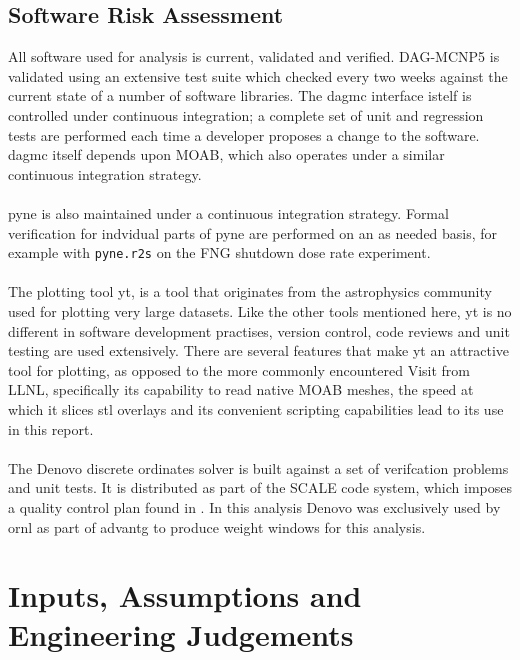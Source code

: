 \documentclass[12pt]{article}
\begin{document}
\subsection{Software Risk Assessment}
All software used for analysis is current, validated and verified. DAG-MCNP5
is validated using an extensive test suite which checked every two weeks against
the current state of a number of software libraries.  The \gls{dagmc} interface
istelf is controlled under continuous integration; a complete set of unit and
regression tests are performed each time a developer proposes a change to the
software.  \gls{dagmc} itself depends upon MOAB, which also operates under a
similar continuous integration strategy.
\\
\\
\gls{pyne} is also maintained under a continuous integration strategy.  
Formal verification for indvidual parts of \gls{pyne} are performed on an as
needed basis, for example with \texttt{pyne.r2s} on the FNG shutdown dose rate
experiment. \cite{Biondo201677}
\\
\\
The plotting tool yt, is a tool that originates from the astrophysics community used
for plotting very large datasets. Like the other tools mentioned here, yt is no different
in software development practises, version control, code reviews and unit testing are
used extensively. There are several features that make yt an attractive 
tool for plotting, as opposed to the more commonly encountered Visit from LLNL, specifically
its capability to read native MOAB meshes, the speed at which it slices stl overlays and 
its convenient scripting capabilities lead to its use in this report.
\\
\\
The Denovo discrete ordinates solver is built against a set of verifcation 
problems and unit tests. It is distributed as part of the SCALE code system, which imposes
a quality control plan found in \cite{scale_qa}. In this analysis Denovo was exclusively
used by \gls{ornl} as part of \gls{advantg} to produce weight windows for this analysis.

\clearpage
\newpage
\section{Inputs, Assumptions and Engineering Judgements}
\end{document}
